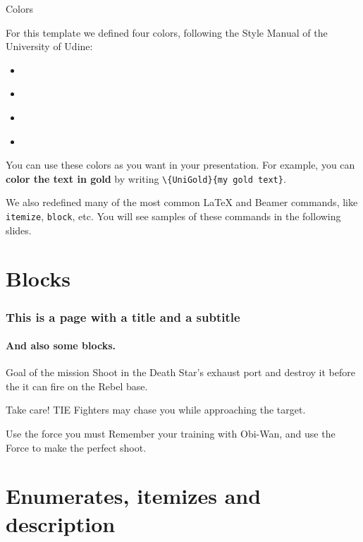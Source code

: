 \documentclass[usenames,dvipsnames]{beamer}
\begin{document}
\begin{frame}{Colors}

For this template we defined four colors, following the Style Manual of the University of Udine:
\begin{itemize}
\item \textcolor{white}{}
\item \textcolor{white}{}
\item \textcolor{white}{}
\item \textcolor{white}{}
\end{itemize}

\vskip 0.5cm

You can use these colors as you want in your presentation. For example, you can \textbf{\textcolor{UniGold}{color the text in gold}} by writing \texttt{\textbackslash\{UniGold\}\{my gold text\}}.

\vskip 0.5cm

We also redefined many of the most common \LaTeX{} and Beamer commands, like \texttt{itemize}, \texttt{block}, etc. You will see samples of these commands in the following slides.

\end{frame}

\section{Blocks}

\begin{frame} 
\frametitle{This is a page with a title and a subtitle} 
\framesubtitle{And also some blocks.} 
\begin{block}{Goal of the mission}
Shoot in the Death Star's exhaust port and destroy it before the it can fire on the Rebel base.
\end{block} 
\begin{alertblock}{Take care!}
TIE Fighters may chase you while approaching the target.
\end{alertblock} 
\begin{exampleblock}{Use the force you must}
Remember your training with Obi-Wan, and use the Force to make the perfect shoot.
\end{exampleblock} 

\end{frame}

\section{Enumerates, itemizes and description}
\end{document}
